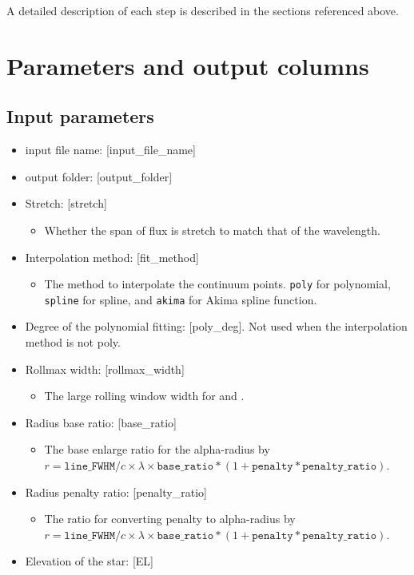 \documentclass{article}
\begin{document}
A detailed description of each step is described in the sections referenced above.

\section{Parameters and output columns}

\subsection{Input parameters}

\begin{itemize}
    \item input file name: [input_file_name]
    \item output folder: [output_folder]
    \item Stretch: [stretch]
    \begin{itemize}
        \item Whether the span of flux is stretch to match that of the wavelength. 
    \end{itemize}
    \item Interpolation method: [fit_method]
    \begin{itemize}
        \item The method to interpolate the continuum points. \texttt{poly} for polynomial, \texttt{spline} for spline, and \texttt{akima} for Akima spline function. 
    \end{itemize}
    \item Degree of the polynomial fitting: [poly_deg]. Not used when the interpolation method is not poly.
    \item Rollmax width: [rollmax_width]
    \begin{itemize}
        \item The large rolling window width for  and . 
    \end{itemize}
    \item Radius base ratio: [base_ratio]
    \begin{itemize}
        \item The base enlarge ratio for the alpha-radius by $r = \texttt{line\_FWHM} / c \times \lambda \times \texttt{base\_ratio} * (1 + \texttt{penalty} * \texttt{penalty\_ratio})$. 
    \end{itemize}
    \item Radius penalty ratio: [penalty_ratio]
    \begin{itemize}
        \item The ratio for converting penalty to alpha-radius by $r = \texttt{line\_FWHM} / c \times \lambda \times \texttt{base\_ratio} * (1 + \texttt{penalty} * \texttt{penalty\_ratio})$. 
    \end{itemize}
    \item Elevation of the star: [EL]
\end{itemize}
\end{document}
